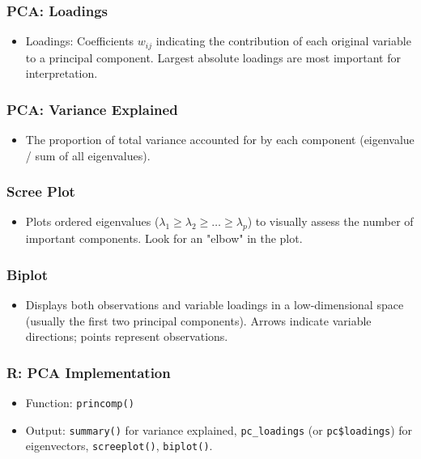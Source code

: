 \documentclass{beamer}
\newcommand{\code}[1]{\texttt{#1}}
\begin{document}
\begin{frame}
    \frametitle{PCA: Loadings}
    \begin{itemize}
        \item Loadings: Coefficients $w_{ij}$ indicating the contribution of each original variable to a principal component. Largest absolute loadings are most important for interpretation.
    \end{itemize}
\end{frame}

\begin{frame}
    \frametitle{PCA: Variance Explained}
    \begin{itemize}
        \item The proportion of total variance accounted for by each component (eigenvalue / sum of all eigenvalues).
    \end{itemize}
\end{frame}

\begin{frame}
    \frametitle{Scree Plot}
    \begin{itemize}
        \item Plots ordered eigenvalues ($\lambda_1 \ge \lambda_2 \ge \dots \ge \lambda_p$) to visually assess the number of important components. Look for an "elbow" in the plot.
    \end{itemize}
\end{frame}

\begin{frame}
    \frametitle{Biplot}
    \begin{itemize}
        \item Displays both observations and variable loadings in a low-dimensional space (usually the first two principal components). Arrows indicate variable directions; points represent observations.
    \end{itemize}
\end{frame}

\begin{frame}
    \frametitle{R: PCA Implementation}
    \begin{itemize}
        \item Function: \code{princomp()}
        \item Output: \code{summary()} for variance explained, \texttt{pc\_loadings} (or \code{pc\$loadings}) for eigenvectors, \code{screeplot()}, \code{biplot()}.
    \end{itemize}
\end{frame}
\end{document}
